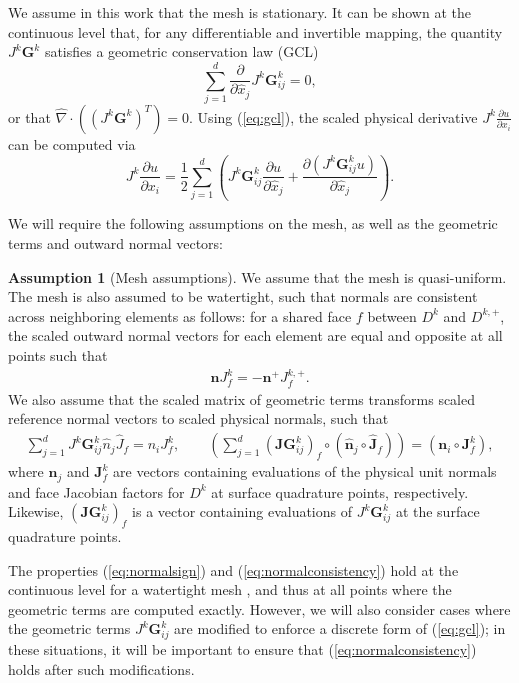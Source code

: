 \documentclass[preprint,10pt]{article}
\theoremstyle{definition}
\theoremstyle{lemma}
\theoremstyle{theorem}
\theoremstyle{assumption}
\newtheorem{assumption}{Assumption}
\renewcommand{\hat}{\widehat}
\newcommand{\pd}[2]{\frac{\partial#1}{\partial#2}}
\newcommand{\LRp}[1]{\left( #1 \right)}
\newcommand{\Grad} {\ensuremath{\nabla}}
\newcommand{\lcwnote}[1]{{\color{magenta}{#1}}}
\begin{document}
{We assume in this work that the mesh is stationary.  It can be shown at the continuous level that, for any differentiable and invertible mapping, the quantity $J^k\bm{G}^k$ satisfies a geometric conservation law (GCL) \cite{kopriva2006metric, thomas1979geometric}
\begin{equation}
\sum_{j=1}^d\pd{}{\hat{x}_j}J^k\bm{G}^k_{ij} = 0,
\label{eq:gcl}
\end{equation}
or that $\hat{\Grad}\cdot \LRp{\LRp{J^k\bm{G}^k}^T} = 0$.  Using (\ref{eq:gcl}), the scaled physical derivative $J^k\pd{u}{x_i}$ can be computed via
\begin{equation}
J^k\pd{u}{x_i} = \frac{1}{2}\sum_{j=1}^d \LRp{J^k\bm{G}^k_{ij}\pd{u}{\hat{x}_j} + \pd{\LRp{J^k\bm{G}^k_{ij}u}}{\hat{x}_j}}.
\label{eq:splitderiv}
\end{equation}

We will require the following assumptions on the mesh, as well as the geometric terms and outward normal vectors:
\begin{assumption}[Mesh assumptions]
We assume that the mesh is quasi-uniform.  The mesh is also assumed to be watertight, such that normals are consistent across neighboring elements as follows: for a shared face $f$ between $D^k$ and $D^{k,+}$, the scaled outward normal vectors for each element are equal and opposite at all points such that 
\begin{align}
\bm{n}J^k_f = -\bm{n}^+J^{k,+}_f.
\label{eq:normalsign}
\end{align}
We also assume that the scaled matrix of geometric terms transforms scaled reference normal vectors to scaled physical normals, such that
\begin{align}
\sum_{j=1}^d J^k\bm{G}^k_{ij} \hat{n}_j\hat{J}_f = n_i J^k_f, \qquad \LRp{\sum_{j=1}^d \LRp{\bm{JG}^k_{ij}}_f \circ\LRp{\hat{\bm{n}}_j\circ\hat{\bm{J}}_f}}
= \LRp{\bm{n}_i\circ\bm{J}^k_f},
\label{eq:normalconsistency}
\end{align}
where $\bm{n}_j$ and $\bm{J}^k_f$ are vectors containing evaluations of the physical unit normals and face Jacobian factors for $D^k$ at surface quadrature points, respectively.
Likewise, $\LRp{\bm{JG}^k_{ij}}_f$ \lcwnote{(This could be written as $\bm{J}_f^{\bm{G}^k_{ij}}$.)} is a vector containing evaluations of $J^k\bm{G}^k_{ij}$ at the surface quadrature points.
\label{ass:norm}
\end{assumption}
The properties (\ref{eq:normalsign}) and (\ref{eq:normalconsistency}) hold at the continuous level for a watertight mesh \cite{ciarlet1978finite}, and thus at all points where the geometric terms are computed exactly.  However, we will also consider cases where the geometric terms $J^k\bm{G}^k_{ij}$ are modified to enforce a discrete form of (\ref{eq:gcl}); in these situations, it will be important to ensure that (\ref{eq:normalconsistency}) holds after such modifications.  

}
\end{document}

